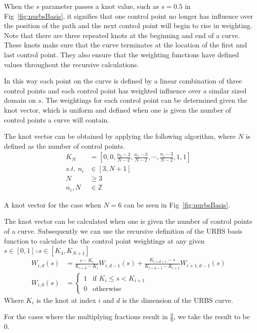 When the $s$ parameter passes a knot value, such as $s = 0.5$ in Fig~\ref{fig:nurbsBasis}, it signifies that one control point no longer has influence over the position of the path and the next control point will begin to rise in weighting. Note that there are three repeated knots at the beginning and end of a curve. These knots make sure that the curve terminates at the location of the first and last control point. They also ensure that the weighting functions have defined values throughout the recursive calculations.

In this way each point on the curve is defined by a linear combination of three control points and each control point has weighted influence over a similar sized domain on $s$. The weightings for each control point can be determined given the knot vector, which is uniform and defined when one is given the number of control points a curve will contain.

The knot vector can be obtained by applying the following algorithm, where $N$ is defined as the number of control points.
\begin{align*}
K_N &= \left[0, 0,  \frac{n_0 - 3}{N-2}, \frac{n_1 - 3}{N-2}, \cdots ,\frac{n_i - 3}{N-2}, 1, 1\right]\\  
\textit{s.t. }n_i &\in \left[3, N+1\right]
\\ N &\geq 3
\\n_i, N &\in \mathbb{Z}
\end{align*}

A knot vector for the case when $N = 6$ can be seen in Fig~\ref{fig:nurbsBasis}.

The knot vector can be calculated when one is given the number of control points of a curve. Subsequently we can use the recursive definition of the URBS basis function to calculate the the control point weightings at any given $s \in [0, 1] \therefore s \in [K_3, K_{N+1}]$
\begin{align*}
W_{i,d}(s) &=   \frac{s - K_i}{K_{i+d} - K_i}W_{i,d-1}(s)  +  \frac{K_{i + d + 1} - s}{K_{i + d + 1} - K_{i+1}}W_{i+1,d-1}(s)\\
W_{i,0}(s) &= \begin{cases}
   1 & \text{if } K_i \leq s < K_{i+1} \\
   0 & \text{otherwise}
  \end{cases}
\end{align*}
Where $K_i$ is the knot at index $i$ and $d$ is the dimension of the URBS curve.

For the cases where the multiplying fractions result in $\frac{0}{0}$, we take the result to be $0$.

